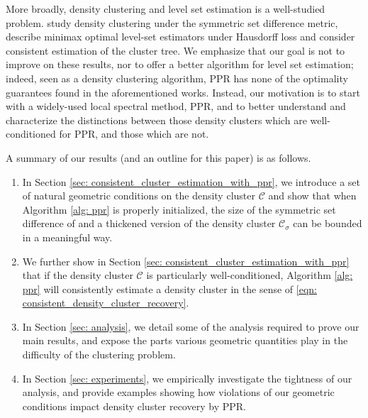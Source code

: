 \documentclass[11pt,twoside]{article}
\newcommand{\1}{\mathbf{1}}
\newcommand{\Cset}{\mathcal{C}}
\newcommand{\Csig}{\Cset_{\sigma}}
\newcommand{\Cest}{\widehat{C}}
\begin{document}
More broadly, density clustering and level set estimation is a well-studied
problem. \citet{polonik1995, rigollet2009} study density clustering under the 
symmetric set difference metric, \citet{tsybakov1997, singh2009} describe
minimax optimal level-set estimators under Hausdorff loss and
\citet{hartigan1981, chaudhuri2010, balakrishnan2013} consider consistent estimation of the
cluster tree.
We emphasize that our goal is not to improve on these
results, nor to offer a better algorithm for level set estimation; indeed, seen as
a density clustering algorithm, PPR has none of the optimality guarantees 
found in the aforementioned works. Instead, our motivation is to start with a 
widely-used local spectral method, PPR, and to better understand and
characterize the distinctions between those density clusters which are
well-conditioned for PPR, and those which are not. 


A summary of our results (and an outline for this
paper) is as follows.

\begin{enumerate}
\item In Section \ref{sec: consistent_cluster_estimation_with_ppr}, we introduce
  a set of natural geometric conditions on the density cluster $\Cset$
  and show that when Algorithm \ref{alg: ppr} is properly initialized, the size of
  the symmetric set difference of \smash{$\Cest$} and a thickened version of the
  density cluster $\Csig$ can be bounded in a meaningful way.
	
\item We further show in Section \ref{sec:
    consistent_cluster_estimation_with_ppr} that if the density cluster 
  $\Cset$ is particularly well-conditioned, Algorithm \ref{alg: ppr}
  will consistently estimate a density cluster in the sense of
  \eqref{eqn: consistent_density_cluster_recovery}. 
	
\item In Section \ref{sec: analysis}, we detail some of the analysis required to
  prove our main results, and expose the parts various geometric quantities play 
  in the difficulty of the clustering problem. 
	
\item In Section \ref{sec: experiments}, we empirically investigate the
  tightness of our analysis, and provide examples showing how violations of our
  geometric conditions impact density cluster recovery by PPR.
\end{enumerate}
\end{document}
